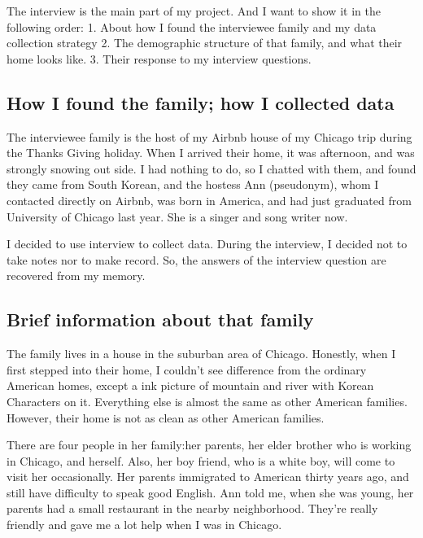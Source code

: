 The interview is the main part of my project. And I want to show it in the
following order: 1. About how I found the interviewee family and my data
collection strategy 2. The demographic structure of that family, and what their
home looks like. 3. Their response to my interview questions.
\subsection{How I found the family; how I collected data}
The interviewee family is the host of my Airbnb house of my Chicago trip during
the Thanks Giving holiday. When I arrived their home, it was afternoon, and was
strongly snowing out side. I had nothing to do, so I chatted with them, and
found they came from South Korean, and the hostess Ann (pseudonym), whom I contacted
directly on Airbnb, was born in America, and had just graduated from 
University of Chicago last year. She is a singer and song writer now.
\par
I decided to use interview to collect data. During the interview, I decided not
to take notes nor to make record. So, the answers of the interview question are
recovered from my memory. 
\subsection{Brief information about that family}
The family lives in a house in the suburban area of Chicago. Honestly, when I
first stepped into their home, I couldn't see difference from the ordinary
American homes, except a ink picture of mountain and river with Korean
Characters on it. Everything else is almost the same as other American
families. However, their home is not as clean as other American families. 
\par
There are four people in her family:her parents, her elder brother who is
working in Chicago, and herself. Also, her boy friend, who is a white boy, will
come to visit her occasionally. Her parents immigrated to American thirty years
ago, and still have difficulty to speak good English. Ann told
me, when she was young, her parents had a small restaurant in the nearby
neighborhood. They're really friendly and gave me a lot help when I was in
Chicago.

